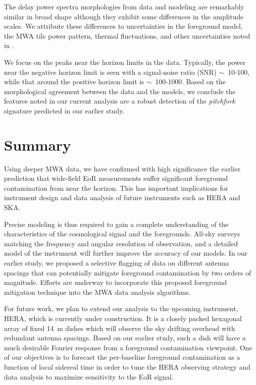 \documentclass[preprint2,apjl,numberedappendix,twocolappendix,appendixfloats]{emulateapj}
\begin{document}
The delay power spectra morphologies from data and modeling are remarkably similar in broad shape although they exhibit some differences in the amplitude scales. We attribute these differences to uncertainties in the foreground model, the MWA tile power pattern, thermal fluctuations, and other uncertainties noted in \citet{thy15}. 

We focus on the peaks near the horizon limits in the data. Typically, the power near the negative horizon limit is seen with a signal-noise ratio (SNR) $\sim$~10-100, while that around the positive horizon limit is $\sim$~100-1000. %
Based on the morphological agreement between the data and the models, we conclude the features noted in our current analysis are a robust detection of the {\it pitchfork} signature predicted in our earlier study.

\section{Summary}\label{sec:summary}

Using deeper MWA data, we have confirmed with high significance the earlier prediction that wide-field EoR measurements suffer significant foreground contamination from near the horizon. This has important implications for instrument design and data analysis of future instruments such as HERA and SKA. 

Precise modeling is thus required to gain a complete understanding of the characteristics of the cosmological signal and the foregrounds. All-sky surveys matching the frequency and angular resolution of observation, and a detailed model of the instrument will further improve the accuracy of our models. In our earlier study, we proposed a selective flagging of data on different antenna spacings that can potentially mitigate foreground contamination by two orders of magnitude. Efforts are underway to incorporate this proposed foreground mitigation technique into the MWA data analysis algorithms.

For future work, we plan to extend our analysis to the upcoming instrument, HERA, which is currently under construction. It is a closely packed hexagonal array of fixed 14~m dishes which will observe the sky drifting overhead with redundant antenna spacings. Based on our earlier study, such a dish will have a much desirable Fourier response from a foreground contamination viewpoint. One of our objectives is to forecast the per-baseline foreground contamination as a function of local sidereal time in order to tune the HERA observing strategy and data analysis to maximize sensitivity to the EoR signal.
\end{document}
